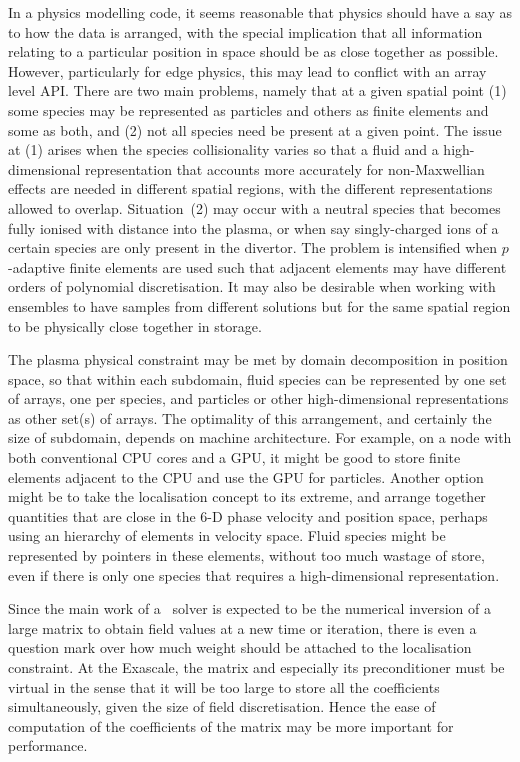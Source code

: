 In a physics modelling code, it seems reasonable that physics should have a say as to how 
the data is arranged, with the special implication that all information relating to a particular position in
space should be as close together as possible. However, particularly for edge physics, this
may lead to conflict with an array level API. There are two main problems, namely that
at a given spatial point (1) some species may be represented as particles and others
as finite elements and some as both, and (2) not all species need be present at a given point.
The issue at (1) arises when the species collisionality varies so that a fluid and a 
high-dimensional representation that accounts more accurately for non-Maxwellian effects are needed in
different spatial regions, with the different representations allowed to overlap. Situation~(2)
may occur with a neutral species that becomes fully ionised with distance into the plasma,
or when say singly-charged ions of a certain species are only present in the divertor.
The problem is intensified when $p$-adaptive finite elements are used such that adjacent
elements may have different orders of polynomial discretisation. It may also be desirable
when working with ensembles to have samples from different solutions but for the same spatial region
to be physically close together in storage.

The plasma physical constraint may be met by domain decomposition in position space,
so that within each subdomain,
fluid species can be represented by one set of arrays, one per species, and particles
or other high-dimensional representations as other set(s) of arrays. The optimality of
this arrangement, and certainly the size of subdomain, depends on machine architecture.
For example, on a node with both conventional CPU cores and a GPU, it might be good to store finite
elements adjacent to the CPU and use the GPU for particles. Another option
might be to take the localisation concept to its extreme, and arrange together quantities that are close
in the 6-D phase velocity and position space, perhaps using an hierarchy of elements in velocity space.
Fluid species might be represented by pointers in these elements, without too much wastage
of store, even if there is only one species that requires a high-dimensional representation.

Since the main work of a \nep\ solver is expected to be the numerical inversion of a
large matrix to obtain field values at a new time or iteration, there is even a question
mark over how much weight should be attached to the localisation constraint. At the Exascale,
the matrix and especially its preconditioner must be virtual in the sense that it will
be too large to store all the coefficients simultaneously, given the size of field discretisation.
Hence the ease
of computation of the coefficients of the matrix may be more important for performance. 



